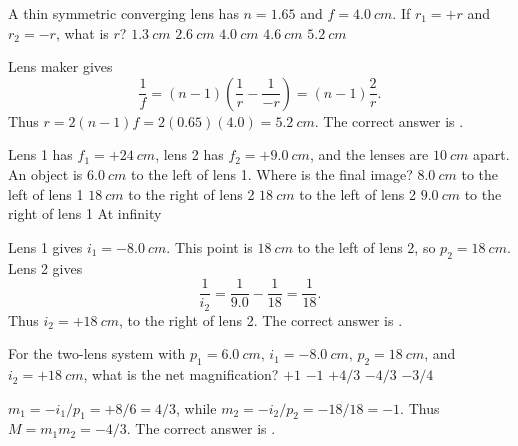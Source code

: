 \documentclass[full,print,11pt,a4paper]{physicsquiz}
\begin{document}
\begin{quizbank}
  \begin{quizquestion}[
    id=optics-lensmaker-013,
    topic=thin-lenses,
    difficulty=applied,
    marks=1,
    correct=E,
    tags={lens-maker,calculation},
    outcome={Use the lens maker equation for a symmetric converging lens}
  ]
    A thin symmetric converging lens has \(n=1.65\) and \(f=\SI{4.0}{cm}\).
    If \(r_1=+r\) and \(r_2=-r\), what is \(r\)?
    \choices
      {\(\SI{1.3}{cm}\)}
      {\(\SI{2.6}{cm}\)}
      {\(\SI{4.0}{cm}\)}
      {\(\SI{4.6}{cm}\)}
      {\(\SI{5.2}{cm}\)}
  \end{quizquestion}
  \begin{quizsolution}
    Lens maker gives
    \[
      \frac{1}{f}=(n-1)\left(\frac{1}{r}-\frac{1}{-r}\right)
      =(n-1)\frac{2}{r}.
    \]
    Thus \(r=2(n-1)f=2(0.65)(4.0)=\SI{5.2}{cm}\). The correct answer is
    \quizcorrectletter.
  \end{quizsolution}

  \begin{quizquestion}[
    id=optics-twolens-014,
    topic=two-lens-systems,
    difficulty=challenge,
    marks=1,
    correct=B,
    tags={two-lens-system,calculation},
    outcome={Find the final image in a two-lens system}
  ]
    Lens 1 has \(f_1=+\SI{24}{cm}\), lens 2 has \(f_2=+\SI{9.0}{cm}\),
    and the lenses are \(\SI{10}{cm}\) apart. An object is
    \(\SI{6.0}{cm}\) to the left of lens 1. Where is the final image?
    \choices
      {\(\SI{8.0}{cm}\) to the left of lens 1}
      {\(\SI{18}{cm}\) to the right of lens 2}
      {\(\SI{18}{cm}\) to the left of lens 2}
      {\(\SI{9.0}{cm}\) to the right of lens 1}
      {At infinity}
  \end{quizquestion}
  \begin{quizsolution}
    Lens 1 gives \(i_1=-\SI{8.0}{cm}\). This point is
    \(\SI{18}{cm}\) to the left of lens 2, so \(p_2=\SI{18}{cm}\).
    Lens 2 gives
    \[
      \frac{1}{i_2}=\frac{1}{9.0}-\frac{1}{18}=\frac{1}{18}.
    \]
    Thus \(i_2=+\SI{18}{cm}\), to the right of lens 2. The correct answer
    is \quizcorrectletter.
  \end{quizsolution}

  \begin{quizquestion}[
    id=optics-twolens-015,
    topic=two-lens-systems,
    difficulty=challenge,
    marks=1,
    correct=D,
    tags={two-lens-system,magnification},
    outcome={Find the net magnification of a two-lens system}
  ]
    For the two-lens system with \(p_1=\SI{6.0}{cm}\),
    \(i_1=-\SI{8.0}{cm}\), \(p_2=\SI{18}{cm}\), and
    \(i_2=+\SI{18}{cm}\), what is the net magnification?
    \choices
      {\(+1\)}
      {\(-1\)}
      {\(+4/3\)}
      {\(-4/3\)}
      {\(-3/4\)}
  \end{quizquestion}
  \begin{quizsolution}
    \(m_1=-i_1/p_1=+8/6=4/3\), while
    \(m_2=-i_2/p_2=-18/18=-1\). Thus
    \(M=m_1m_2=-4/3\). The correct answer is \quizcorrectletter.
  \end{quizsolution}


\end{quizbank}
\end{document}
